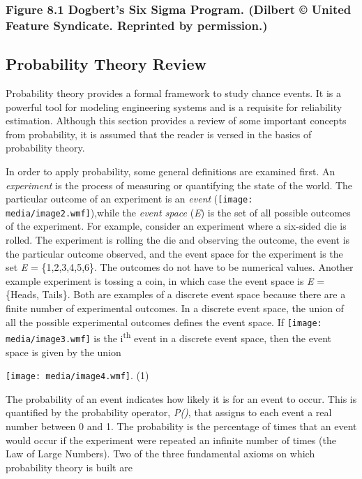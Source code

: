 \subsubsection*{Figure 8.1 Dogbert's Six Sigma Program. (Dilbert ©
United Feature Syndicate. Reprinted by
permission.)}\label{figure-8.1-dogberts-six-sigma-program.-dilbert-united-feature-syndicate.-reprinted-by-permission.}

\subsection{Probability Theory Review}\label{probability-theory-review}

Probability theory provides a formal framework to study chance events.
It is a powerful tool for modeling engineering systems and is a
requisite for reliability estimation. Although this section provides a
review of some important concepts from probability, it is assumed that
the reader is versed in the basics of probability theory.

In order to apply probability, some general definitions are examined
first. An \emph{experiment} is the process of measuring or quantifying
the state of the world. The particular outcome of an experiment is an
\emph{event} (\texttt{[image: media/image2.wmf]}),while the \emph{event
space} (\emph{E}) is the set of all possible outcomes of the experiment.
For example, consider an experiment where a six-sided die is rolled. The
experiment is rolling the die and observing the outcome, the event is
the particular outcome observed, and the event space for the experiment
is the set \emph{E} = \{1,2,3,4,5,6\}. The outcomes do not have to be
numerical values. Another example experiment is tossing a coin, in which
case the event space is \emph{E} = \{Heads, Tails\}. Both are examples
of a discrete event space because there are a finite number of
experimental outcomes. In a discrete event space, the union of all the
possible experimental outcomes defines the event space. If
\texttt{[image: media/image3.wmf]} is the i\textsuperscript{th} event in
a discrete event space, then the event space is given by the union

\texttt{[image: media/image4.wmf]}. (1)

The probability of an event indicates how likely it is for an event to
occur. This is quantified by the probability operator, \emph{P()}, that
assigns to each event a real number between 0 and 1. The probability is
the percentage of times that an event would occur if the experiment were
repeated an infinite number of times (the Law of Large Numbers). Two of
the three fundamental axioms on which probability theory is built are

